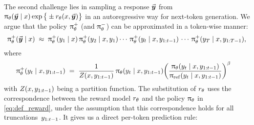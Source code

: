 The second challenge lies in sampling a response $\vec{\boldsymbol{y}}\!\,$ from $\uppi_{\theta}(\vec{\boldsymbol{y}}\!\, \mid x)
		\exp \big\{ \pm r_{\theta}(x, \vec{\boldsymbol{y}}\!\,) \big\}$ in an autoregressive way for next-token generation. 
We argue that the policy $\uppi_{\theta}^+$ (and $\uppi_{\theta}^-$) can be approximated in a token-wise manner:
		\begin{align*}
			\uppi_{\theta}^+(\vec{\boldsymbol{y}}\!\, \mid x)
		 \; \approx \; \uppi_{\theta}^+(y_{1} \mid x) \, \uppi_{\theta}^+(y_{2} \mid x, y_{1})  \cdots \, \uppi_{\theta}^+(y_{t} \mid x, y_{1:t-1}) \,
			\cdots \, \uppi_{\theta}^+(y_{T} \mid x, y_{1:T-1}),
		\end{align*}
		where
		\begin{align*}
			& \policythetapos(\tokent{t} \mid \prompt, \tokenttot{1}{t-1}) \; = \; 
			\frac{1}{\Partition(\prompt, \tokenttot{1}{t-1})} \, 
			\policytheta(\tokent{t} \mid \prompt, \tokenttot{1}{t-1})
			\bigg( \frac{\policytheta(\tokent{t} \mid \prompt, \tokenttot{1}{t-1})}{\policyref(\tokent{t} \mid \prompt, \tokenttot{1}{t-1})} \bigg)^{\parabeta} %
		\end{align*}
		with $Z(x, y_{1:t-1})$ being a partition function. 
        The substitution of $r_{\theta}$ uses the correspondence between the reward model 
        $r_{\theta}$ and the policy $\uppi_{\theta}$ in \cref{eq:def_reward}, under the assumption that this correspondence holds for all truncations~$y_{1:t-1}$. It gives us a direct per-token prediction rule:
